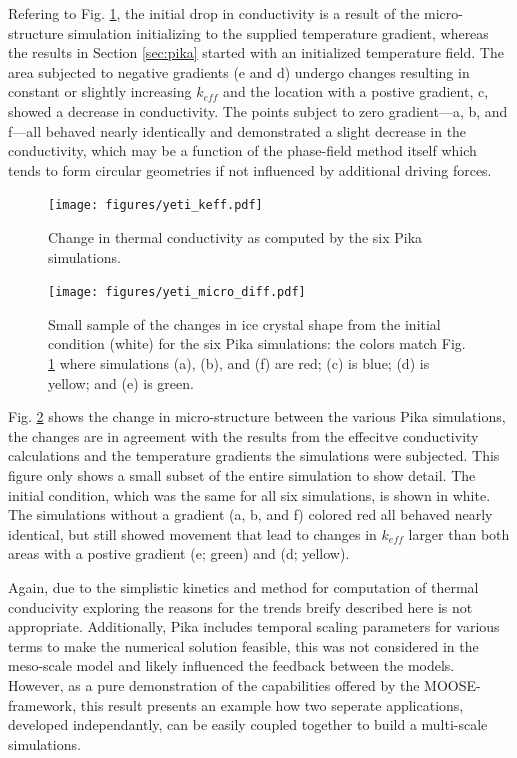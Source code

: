 Refering to Fig. \ref{fig:yeti_keff}, the initial drop in conductivity is a result of the micro-structure simulation initializing to the supplied temperature gradient, whereas the results in Section \ref{sec:pika} started with an initialized temperature field. The area subjected to negative gradients (e and d) undergo changes resulting in constant or slightly increasing $k_{eff}$ and the location with a postive gradient, c, showed a decrease in conductivity. The points subject to zero gradient---a, b, and f---all behaved nearly identically and demonstrated a slight decrease in the conductivity, which may be a function of the phase-field method itself which tends to form circular geometries if not influenced by additional driving forces.

\begin{figure}[!ht]
  \texttt{[image: figures/yeti\_keff.pdf]}
  \caption{Change in thermal conductivity as computed by the six Pika simulations.}
  \label{fig:yeti_keff}
\end{figure}
\begin{figure}[H]
  \texttt{[image: figures/yeti\_micro\_diff.pdf]}
  \caption{Small sample of the changes in ice crystal shape from the initial condition (white) for the six Pika simulations: the colors match Fig. \ref{fig:yeti_keff} where simulations (a), (b), and (f) are red; (c) is blue; (d) is yellow; and (e) is green.}
  \label{fig:yeti_micro}
\end{figure}

Fig. \ref{fig:yeti_micro} shows the change in micro-structure between the various Pika simulations, the changes are in agreement with the results from the effecitve conductivity calculations and the temperature gradients the simulations were subjected. This figure only shows a small subset of the entire simulation to show detail. The initial condition, which was the same for all six simulations, is shown in white. The simulations without a gradient (a, b, and f) colored red all behaved nearly identical, but still showed movement that lead to changes in $k_{eff}$ larger than both areas with a postive gradient (e; green) and (d; yellow).

Again, due to the simplistic kinetics and method for computation of thermal conducivity exploring the reasons for the trends breify described here is not appropriate. Additionally, Pika includes temporal scaling parameters for various terms to make the numerical solution feasible, this was not considered in the meso-scale model and likely influenced the feedback between the models. However, as a pure demonstration of the capabilities offered by the MOOSE-framework, this result presents an example how two seperate applications, developed independantly, can be easily coupled together to build a multi-scale simulations.



